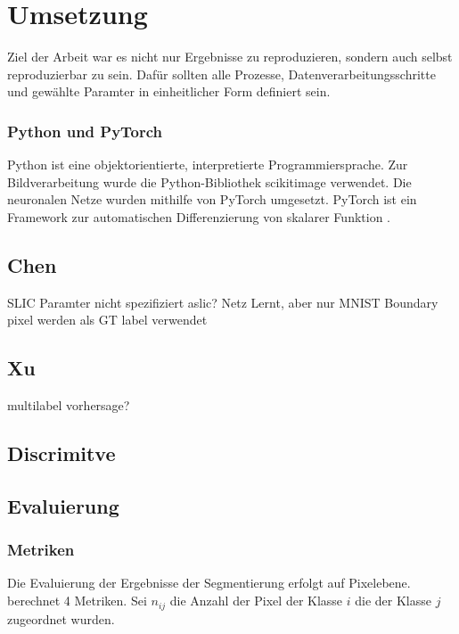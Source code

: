 \chapter{Umsetzung}
Ziel der Arbeit war es nicht nur Ergebnisse zu reproduzieren, sondern auch selbst reproduzierbar zu sein. 
Dafür sollten alle Prozesse, Datenverarbeitungsschritte und gewählte Paramter in einheitlicher Form definiert sein.  
\subsection{Python und PyTorch}
Python ist eine objektorientierte, interpretierte Programmiersprache.
Zur Bildverarbeitung wurde die Python-Bibliothek scikitimage verwendet.
Die neuronalen Netze wurden mithilfe von PyTorch umgesetzt.
PyTorch ist ein Framework zur automatischen Differenzierung von skalarer Funktion \autocite{PaszkeAutomaticdifferentiationPyTorch2017}.
\label{chap:umsetzung}
\section{Chen}
SLIC Paramter nicht spezifiziert 
aslic?
Netz Lernt, aber nur MNIST
Boundary pixel werden als GT label verwendet

\section{Xu}
multilabel vorhersage?

\section{Discrimitve}

\section{Evaluierung}
\label{chap:eval}




\subsection{Metriken}
Die Evaluierung der Ergebnisse der Segmentierung erfolgt auf Pixelebene.
\cite{LongFullyconvolutionalnetworks2015} berechnet 4 Metriken.
Sei \(n_{ij}\) die Anzahl der Pixel der Klasse \(i\) die der Klasse \(j\) zugeordnet wurden.


